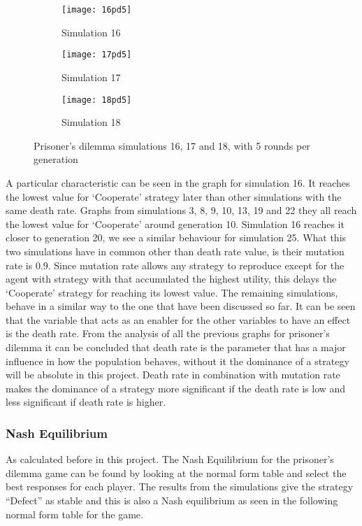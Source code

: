 \begin{figure}[H]       
    \centering
    \begin{subfigure}[b]{0.3\textwidth}
	\centering
	{\texttt{[image: 16pd5]}}   
    	\caption{Simulation 16}
	\label{fig:pds16}
    \end{subfigure}
    \hfill
    \begin{subfigure}[b]{0.3\textwidth}
	\centering
	{\texttt{[image: 17pd5]}}   
    	\caption{Simulation 17}
	\label{fig:pds17}
    \end{subfigure}
    \hfill
    \begin{subfigure}[b]{0.3\textwidth}
	\centering
	{\texttt{[image: 18pd5]}}   
    	\caption{Simulation 18}
	\label{fig:pds18}
    \end{subfigure}
    \caption{Prisoner's dilemma simulations 16, 17 and 18, with 5 rounds per generation}
    \label{pdsim161718r5}
\end{figure}

A particular characteristic can be seen in the graph for simulation 16. It reaches the lowest value for `Cooperate' strategy later than other simulations with the same death rate. Graphs from simulations 3, 8, 9, 10, 13, 19 and 22 they all reach the lowest value for `Cooperate' around generation 10. Simulation 16 reaches it closer to generation 20, we see a similar behaviour for simulation 25. What this two simulations have in common other than death rate value, is their mutation rate is 0.9. Since mutation rate allows any strategy to reproduce except for the agent with strategy with that accumulated the highest utility, this delays the `Cooperate' strategy for reaching its lowest value.		  
The remaining simulations, behave in a similar way to the one that have been discussed  so far. It can be seen that the variable that acts as an enabler for the other variables to have an effect is the death rate. 
From the analysis of all the previous graphs for prisoner's dilemma it can be concluded that death rate is the parameter that has a major influence in how the population behaves, without it the dominance of a strategy will be absolute in this project. Death rate in combination with mutation rate makes the dominance of a strategy more significant if the death rate is low and less significant if death rate is higher.

\subsubsection{Nash Equilibrium}
As calculated before in this project. The Nash Equilibrium for the prisoner's dilemma game can be found by looking at the normal form table and select the best responses for each player. The results from the simulations give the strategy ``Defect'' as stable and this is also a Nash equilibrium as seen in the following normal form table for the game.

